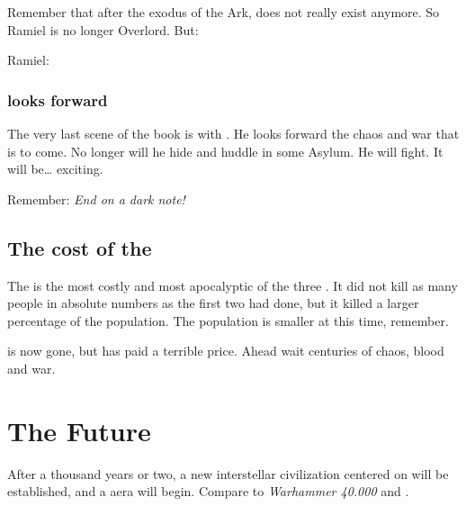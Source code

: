 Remember that after the exodus of the Ark, \Mystraacht{} does not really exist anymore. 
So Ramiel is no longer Overlord. 
But:

\begin{prose}
  Ramiel:
\end{prose}







\subsubsection{\Ishnaruchaefir{} looks forward}
The very last scene of the book is with \Ishnaruchaefir{}.
He looks forward the chaos and war that is to come. 
No longer will he hide and huddle in some Asylum. 
He will fight. 
It will be\ldots{} exciting. 

Remember: \emph{End on a dark note!}









\subsection{The cost of the \thirdbanewar}
The \thirdbanewar{} is the most costly and most apocalyptic of the three \banewars. 
It did not kill as many people in absolute numbers as the first two had done, but it killed a larger percentage of the population. 
The population is smaller at this time, remember. 

\Daggerrain{} is now gone, but \Miith{} has paid a terrible price. 
Ahead wait centuries of chaos, blood and war. 














\section{The Future}
After a thousand years or two, a new interstellar civilization centered on \Miith{} will be established, and a  aera will begin. Compare to \emph{Warhammer 40.000} and . 









